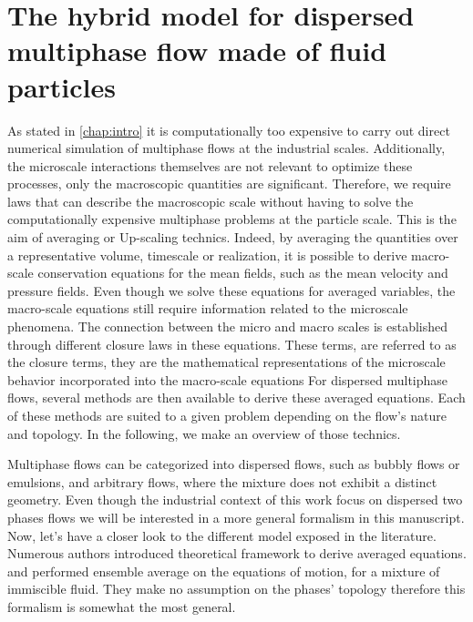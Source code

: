 \chapter{The hybrid model for dispersed multiphase flow made of fluid particles}
\label{chap:avg}

As stated in \ref{chap:intro} it is computationally too expensive to carry out direct numerical simulation of multiphase flows at the industrial scales. 
Additionally, the microscale interactions themselves are not relevant to optimize these processes, only the macroscopic quantities are significant. 
Therefore, we require laws that can describe the macroscopic scale without having to solve the computationally expensive multiphase problems at the particle scale. 
This is the aim of averaging or Up-scaling technics.
Indeed, by averaging the quantities over a representative volume, timescale or realization, it is possible to derive macro-scale conservation equations for the mean fields, such as the mean velocity and pressure fields. 
Even though we solve these equations for averaged variables, the macro-scale equations still require information related to the microscale phenomena.
The connection between the micro and macro scales is established through different closure laws in these equations. 
These terms, are referred to as the closure terms, they are the mathematical representations of the microscale behavior incorporated into the macro-scale equations
For dispersed multiphase flows, several methods are then available to derive these averaged equations.  
Each of these methods are suited to a given problem depending on the flow's nature and topology. 
In the following, we make an overview of those technics. 

Multiphase flows can be categorized into dispersed flows, such as bubbly flows or emulsions, and arbitrary flows, where the mixture does not exhibit a distinct geometry.
Even though the industrial context of this work focus on dispersed two phases flows we will be interested in a more general formalism in this manuscript. 
Now, let's have a closer look to the different model exposed in the literature. 
Numerous authors introduced theoretical framework to derive averaged equations.
\citet{drew1983mathematical} and \citet{ishii2010thermo} performed ensemble average on the equations of motion, for a mixture of immiscible fluid. 
They make no assumption on the phases' topology therefore this formalism is somewhat the most general. 


